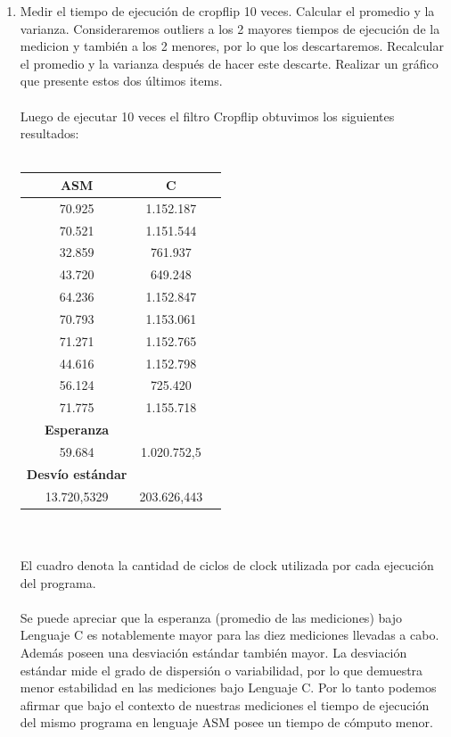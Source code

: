 \begin{enumerate}
    \item Medir el tiempo de ejecución de cropflip 10 veces. Calcular el promedio y la varianza. Consideraremos outliers a los 2 mayores tiempos de ejecución de la medicion y también a los 2 menores, por lo que los descartaremos. Recalcular el promedio y la varianza después de hacer este descarte. Realizar un gráfico que presente estos dos últimos items.\\
\\
Luego de ejecutar 10 veces el filtro Cropflip obtuvimos los siguientes resultados: \\
\\
    	\begin{tabular}[c]{|c|c|c|}
	\hline
		\textbf{ASM} & \textbf{C}\\
		\hline
70.925 &	1.152.187\\
		\hline
70.521 &	1.151.544\\
		\hline
32.859 &	761.937\\
		\hline
43.720 &	649.248\\
		\hline
64.236 &	1.152.847\\
		\hline
70.793 &	1.153.061\\
		\hline
71.271 &	1.152.765\\
		\hline
44.616 &	1.152.798\\
		\hline
56.124 &	725.420\\
		\hline
71.775 &	1.155.718\\
		\hline
	\textbf{Esperanza}	\\
		\hline
59.684 & 1.020.752,5 \\
		\hline
		\textbf{Desvío est\'andar}	\\
		\hline
13.720,5329 & 203.626,443 \\
		\hline
	\end{tabular}\\\\


	El cuadro denota la cantidad de ciclos de clock utilizada por cada ejecuci\'on del programa. \\
	\\
	Se puede apreciar que la esperanza (promedio de las mediciones) bajo Lenguaje C es notablemente mayor para las diez mediciones llevadas a cabo. Adem\'as poseen una desviaci\'on est\'andar tambi\'en mayor. La desviación estándar mide el grado de dispersión o variabilidad, por lo que demuestra menor estabilidad en las mediciones bajo Lenguaje C. Por lo tanto podemos afirmar que bajo el contexto de nuestras mediciones el tiempo de ejecuci\'on del mismo programa en lenguaje ASM posee un tiempo de c\'omputo menor. \\
\\	
	

\end{enumerate}
